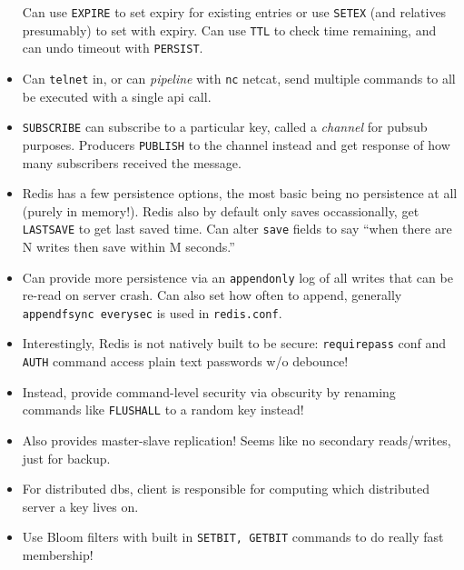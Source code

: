 \documentclass[10pt]{article}
\begin{document}
\begin{itemize}
        Can use \lstinline{EXPIRE} to set expiry for existing entries or use
        \lstinline{SETEX} (and relatives presumably) to set with expiry. Can use
        \lstinline{TTL} to check time remaining, and can undo timeout with
        \lstinline{PERSIST}.
    \item Can \lstinline{telnet} in, or can \emph{pipeline} with \lstinline{nc}
        netcat, send multiple commands to all be executed with a single api
        call.
    \item \lstinline{SUBSCRIBE} can subscribe to a particular key, called a
        \emph{channel} for pubsub purposes. Producers \lstinline{PUBLISH} to the
        channel instead and get response of how many subscribers received the
        message.
    \item Redis has a few persistence options, the most basic being no
        persistence at all (purely in memory!). Redis also by default only saves
        occassionally, get \lstinline{LASTSAVE} to get last saved time. Can
        alter \lstinline{save} fields to say ``when there are N writes then save
        within M seconds.''
    \item Can provide more persistence via an \lstinline{appendonly} log of all
        writes that can be re-read on server crash. Can also set how often to
        append, generally \lstinline{appendfsync everysec} is used in
        \lstinline{redis.conf}.
    \item Interestingly, Redis is not natively built to be secure:
        \lstinline{requirepass} conf and \lstinline{AUTH} command access plain
        text passwords w/o debounce!
    \item Instead, provide command-level security via obscurity by renaming
        commands like \lstinline{FLUSHALL} to a random key instead!
    \item Also provides master-slave replication! Seems like no secondary
        reads/writes, just for backup.
    \item For distributed dbs, client is responsible for computing which
        distributed server a key lives on.
    \item Use Bloom filters with built in \lstinline{SETBIT, GETBIT} commands to
        do really fast membership!
\end{itemize}
\end{document}
